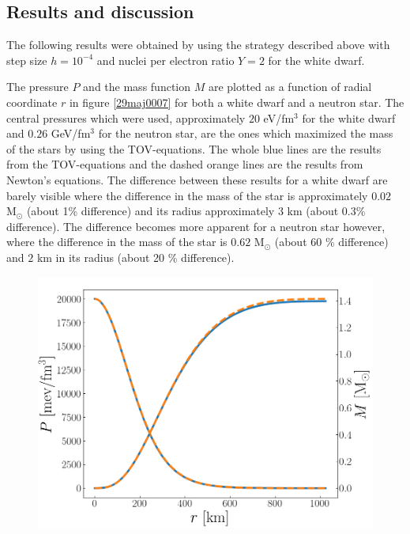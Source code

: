 \documentclass[twocolumn]{article}
\begin{document}
\begin{large}
\subsection*{Results and discussion}
The following results were obtained by using the strategy described above with step size $h=10^{-4}$ and nuclei per electron ratio $Y=2$ for the white dwarf.

The pressure $P$ and the mass function $M$ are plotted as a function of radial coordinate $r$ in figure \ref{29maj0007} for both a white dwarf and a neutron star. The central pressures which were used, approximately $20$ eV/fm$^3$ for the white dwarf and $0.26$ GeV/fm$^3$ for the neutron star, are the ones which maximized the mass of the stars by using the TOV-equations. The whole blue lines are the results from the TOV-equations and the dashed orange lines are the results from Newton's equations. The difference between these results for a white dwarf are barely visible where the difference in the mass of the star is approximately $0.02$ M$_\odot$ (about 1\% difference) and its radius approximately $3$ km (about 0.3\% difference). The difference becomes more apparent for a neutron star however, where the difference in the mass of the star is $0.62$ M$_\odot$ (about 60 \% difference) and $2$  km in its radius (about 20 \% difference). 
\begin{figure}[!t]
    \begin{center}
        \includegraphics[scale=0.35]{WhiteDwarf_example.png}

\end{center}
\end{figure}
\end{large}
\end{document}

